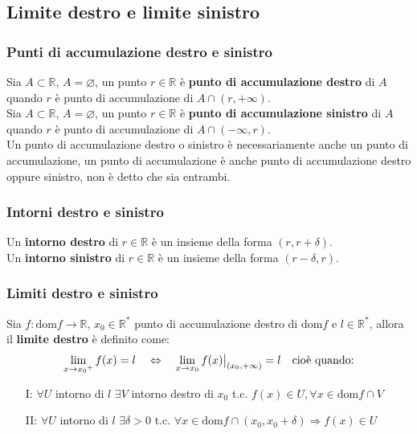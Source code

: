 \documentclass[a4paper]{article}
\newcommand\restr[2]{{%
	\left.\kern-\nulldelimiterspace %
	#1 %
	\vphantom{\big|} %
	\right|_{#2} %
	}}
\newcommand\dom{\text{dom}}
\begin{document}
\subsection{Limite destro e limite sinistro}
\subsubsection*{Punti di accumulazione destro e sinistro}
Sia \(A \subset \mathbb{R}\), \(A = \varnothing\), un punto \(r \in \mathbb{R}\) è \textbf{punto di accumulazione destro} di \(A\) quando \(r\) è punto di accumulazione di \(A \cap \left( r, + \infty \right)\). \\
Sia \(A \subset \mathbb{R}\), \(A = \varnothing\), un punto \(r \in \mathbb{R}\) è \textbf{punto di accumulazione sinistro} di \(A\) quando \(r\) è punto di accumulazione di \(A \cap \left( - \infty, r \right)\). \\
Un punto di accumulazione destro o sinistro è necessariamente anche un punto di accumulazione,
un punto di accumulazione è anche punto di accumulazione destro oppure sinistro, non è detto che sia entrambi.

\subsubsection*{Intorni destro e sinistro}
Un \textbf{intorno destro} di \(r \in \mathbb{R}\) è un insieme della forma \(\left( r, r + \delta \right)\). \\
Un \textbf{intorno sinistro} di \(r \in \mathbb{R}\) è un insieme della forma \(\left( r - \delta, r \right)\).

\subsubsection*{Limiti destro e sinistro}
Sia \(f: \dom f \to \mathbb{R}\), \(x_0 \in \mathbb{R}^*\) punto di accumulazione destro di \(\dom f\) e \(l \in \mathbb{R}^*\), allora il \textbf{limite destro} è definito come:
\[\lim_{x \to {x_0}^+} f(x) = l \quad \Leftrightarrow \quad \lim_{x \to {x_0}} \restr{f(x)}{\left( x_0, + \infty \right)} = l \quad \text{cioè quando:}\]
\begin{itemize}
	\item[I: ] \(\forall U\) intorno di \(l\) \(\exists V\) intorno destro di \(x_0\) t.c. \(f(x) \in U, \forall x \in \dom f \cap V\)
	\item[II: ] \(\forall U\) intorno di \(l\) \(\exists \delta > 0\) t.c. \(\forall x \in \dom f \cap \left( x_0, x_0 + \delta \right) \Rightarrow f(x) \in U\)
\end{itemize}
\end{document}
